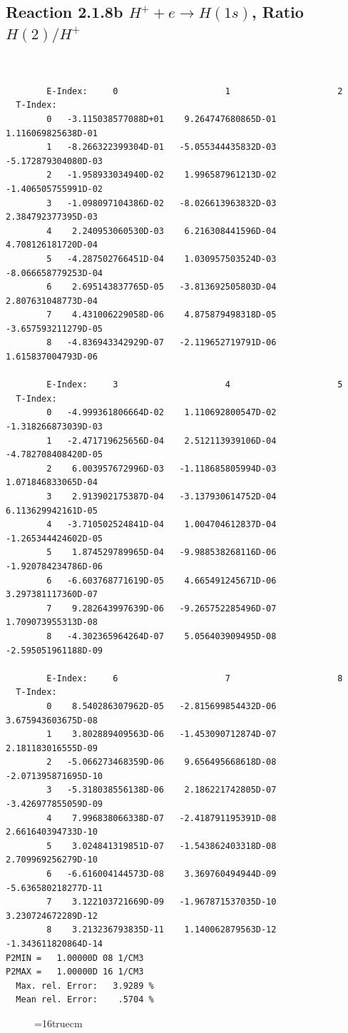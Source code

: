 \documentclass[12pt,dvipdfmx]{article}
\begin{document}
\subsection{
Reaction 2.1.8b  $H^+ + e \rightarrow H(1s) $,  Ratio $H(2)/H^+$
}

\begin{small}\begin{verbatim}


        E-Index:     0                     1                     2
  T-Index:
        0   -3.115038577088D+01    9.264747680865D-01    1.116069825638D-01
        1   -8.266322399304D-01   -5.055344435832D-03   -5.172879304080D-03
        2   -1.958933034940D-02    1.996587961213D-02   -1.406505755991D-02
        3   -1.098097104386D-02   -8.026613963832D-03    2.384792377395D-03
        4    2.240953060530D-03    6.216308441596D-04    4.708126181720D-04
        5   -4.287502766451D-04    1.030957503524D-03   -8.066658779253D-04
        6    2.695143837765D-05   -3.813692505803D-04    2.807631048773D-04
        7    4.431006229058D-06    4.875879498318D-05   -3.657593211279D-05
        8   -4.836943342929D-07   -2.119652719791D-06    1.615837004793D-06

        E-Index:     3                     4                     5
  T-Index:
        0   -4.999361806664D-02    1.110692800547D-02   -1.318266873039D-03
        1   -2.471719625656D-04    2.512113939106D-04   -4.782708408420D-05
        2    6.003957672996D-03   -1.118685805994D-03    1.071846833065D-04
        3    2.913902175387D-04   -3.137930614752D-04    6.113629942161D-05
        4   -3.710502524841D-04    1.004704612837D-04   -1.265344424602D-05
        5    1.874529789965D-04   -9.988538268116D-06   -1.920784234786D-06
        6   -6.603768771619D-05    4.665491245671D-06    3.297381117360D-07
        7    9.282643997639D-06   -9.265752285496D-07    1.709073955313D-08
        8   -4.302365964264D-07    5.056403909495D-08   -2.595051961188D-09

        E-Index:     6                     7                     8
  T-Index:
        0    8.540286307962D-05   -2.815699854432D-06    3.675943603675D-08
        1    3.802889409563D-06   -1.453090712874D-07    2.181183016555D-09
        2   -5.066273468359D-06    9.656495668618D-08   -2.071395871695D-10
        3   -5.318038556138D-06    2.186221742805D-07   -3.426977855059D-09
        4    7.996838066338D-07   -2.418791195391D-08    2.661640394733D-10
        5    3.024841319851D-07   -1.543862403318D-08    2.709969256279D-10
        6   -6.616004144573D-08    3.369760494944D-09   -5.636580218277D-11
        7    3.122103721669D-09   -1.967871537035D-10    3.230724672289D-12
        8    3.213236793835D-11    1.140062879563D-12   -1.343611820864D-14
P2MIN =   1.00000D 08 1/CM3
P2MAX =   1.00000D 16 1/CM3
  Max. rel. Error:   3.9289 %
  Mean rel. Error:    .5704 %

\end{verbatim}\end{small}
\begin{figure} \label{2.1.8rb}
\epsfxsize=16truecm
\end{figure}
\newpage
\end{document}
